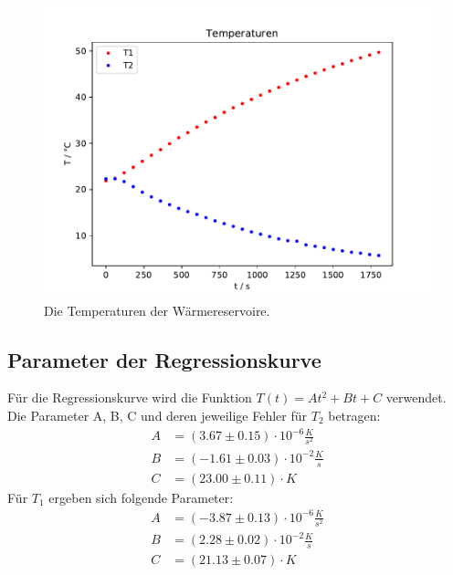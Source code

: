 \begin{figure}[H]
  \centering
  \includegraphics{build/Temperaturen.pdf}
  \caption{Die Temperaturen der Wärmereservoire.}
  \label{fig:Temperaturen}
\end{figure}

\subsection{Parameter der Regressionskurve}
Für die Regressionskurve wird die Funktion $T(t) = At^2 + Bt + C$ verwendet. Die
Parameter A, B, C und deren jeweilige Fehler für $T_2$ betragen:
\begin{align}
  A &= (3.67 \pm 0.15) \cdot 10^{-6} \frac{K}{s^2} \\
  B &= (-1.61 \pm 0.03) \cdot 10^{-2} \frac{K}{s}  \\
  C &= (23.00 \pm 0.11) \cdot K
\end{align}
Für $T_1$ ergeben sich folgende Parameter:
\begin{align}
  A &= (-3.87 \pm 0.13) \cdot 10^{-6} \frac{K}{s^2} \\
  B &= (2.28 \pm 0.02)  \cdot 10^{-2} \frac{K}{s}  \\
  C &= (21.13 \pm 0.07 )\cdot K
\end{align}
